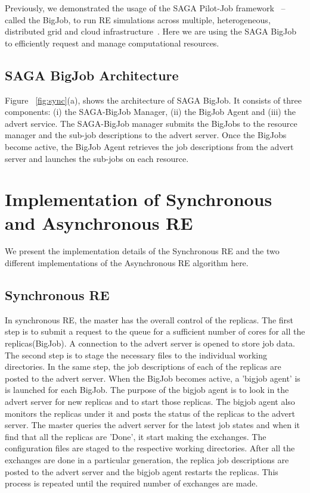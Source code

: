 \documentclass[a4paper,10pt]{article}
\begin{document}
Previously, we demonstrated the usage of the SAGA Pilot-Job framework~\cite{saga_bigjob_condor_cloud} -- called the BigJob, to run RE simulations across multiple, heterogeneous, distributed grid and cloud infrastructure~\cite{Luckow:2008fp}. Here we are using the SAGA BigJob to efficiently request and manage computational resources. 

\subsection{SAGA BigJob Architecture}

Figure ~\ref{fig:sync}(a), shows the architecture of SAGA BigJob. It consists of three components: (i) the SAGA-BigJob Manager, (ii) the BigJob Agent and (iii) the advert service. The SAGA-BigJob manager submits the BigJobs to the resource manager and the sub-job descriptions to the advert server. Once the BigJobs become active, the BigJob Agent retrieves the job descriptions from the advert server and launches the sub-jobs on each resource. 

\section{Implementation of Synchronous and Asynchronous RE}
We present the implementation details of the Synchronous RE and the two different implementations of the Asynchronous RE algorithm here.

\subsection{Synchronous RE}

In synchronous RE, the master has the overall control of the replicas. The first step is to submit a request to the queue for a sufficient number of cores for all the replicas(BigJob). A connection to the advert server is opened to store job data. The second step is to stage the necessary files to the individual working directories. In the same step, the job descriptions of each of the replicas are posted to the advert server. When the BigJob becomes active, a 'bigjob agent' is is launched for each BigJob. The purpose of the bigjob agent is to look in the advert server for new replicas and to start those replicas. The bigjob agent also monitors the replicas under it and posts the status of the replicas to the advert server. The master queries the advert server for the latest job states and when it find that all the replicas are 'Done', it start making the exchanges. The configuration files are staged to the respective working directories. After all the exchanges are done in a particular generation, the replica job descriptions are posted to the advert server and the bigjob agent restarts the replicas. This process is repeated until the required number of exchanges are made. 
\end{document}
